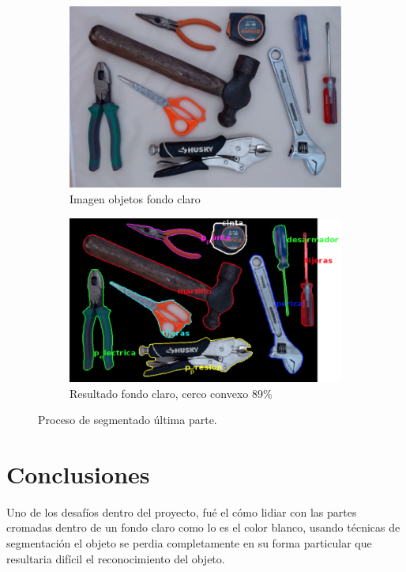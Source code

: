 \documentclass[a4paper, 11pt]{article}
\begin{document}
\begin{figure}[h]
  \begin{subfigure}{0.5\linewidth}
    \includegraphics[width=\linewidth]{resultados_colores/todo_claro}
    \caption{Imagen objetos fondo claro}
    \label{fig:1a}
  \end{subfigure}\hfill
  \begin{subfigure}{0.5\linewidth}
    \includegraphics[width=\linewidth]{resultados_colores/resultado_claro_cconvexo_0_89}
    \caption{Resultado fondo claro, cerco convexo 89\%}
    \label{fig:1a}
  \end{subfigure}
  \caption{Proceso de segmentado última parte.}
  \label{fig:1}
\end{figure}


\newpage
\section{Conclusiones}

Uno de los desafíos dentro del proyecto, fué el cómo lidiar con las partes cromadas dentro de un fondo claro como lo es el color blanco, usando técnicas de segmentación el objeto se perdia completamente en su forma particular que resultaria difícil el reconocimiento del objeto.\\
\end{document}
